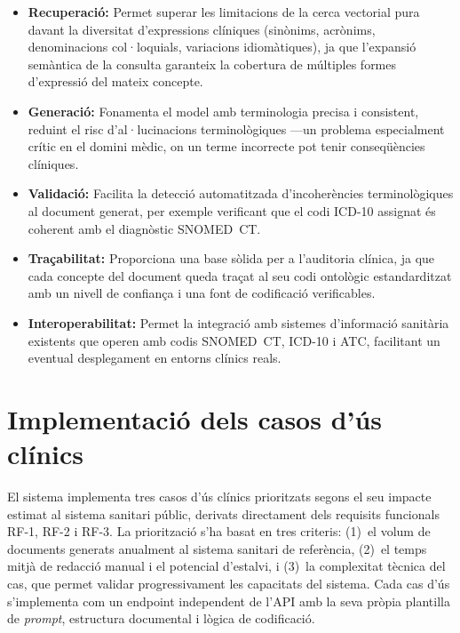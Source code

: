 \documentclass[CAT]{TFUOC}%
\begin{document}
\begin{itemize}
    \item \textbf{Recuperació:} Permet superar les limitacions de la cerca vectorial pura davant la diversitat d'expressions clíniques (sinònims, acrònims, denominacions col·loquials, variacions idiomàtiques), ja que l'expansió semàntica de la consulta garanteix la cobertura de múltiples formes d'expressió del mateix concepte.

    \item \textbf{Generació:} Fonamenta el model amb terminologia precisa i consistent, reduint el risc d'al·lucinacions terminològiques ---un problema especialment crític en el domini mèdic, on un terme incorrecte pot tenir conseqüències clíniques.

    \item \textbf{Validació:} Facilita la detecció automatitzada d'incoherències terminològiques al document generat, per exemple verificant que el codi ICD-10 assignat és coherent amb el diagnòstic SNOMED~CT.

    \item \textbf{Traçabilitat:} Proporciona una base sòlida per a l'auditoria clínica, ja que cada concepte del document queda traçat al seu codi ontològic estandarditzat amb un nivell de confiança i una font de codificació verificables.

    \item \textbf{Interoperabilitat:} Permet la integració amb sistemes d'informació sanitària existents que operen amb codis SNOMED~CT, ICD-10 i ATC, facilitant un eventual desplegament en entorns clínics reals.
\end{itemize}

\section{Implementació dels casos d'ús clínics}

El sistema implementa tres casos d'ús clínics prioritzats segons el seu impacte estimat al sistema sanitari públic, derivats directament dels requisits funcionals RF-1, RF-2 i RF-3. La priorització s'ha basat en tres criteris: (1)~el volum de documents generats anualment al sistema sanitari de referència, (2)~el temps mitjà de redacció manual i el potencial d'estalvi, i (3)~la complexitat tècnica del cas, que permet validar progressivament les capacitats del sistema. Cada cas d'ús s'implementa com un endpoint independent de l'API amb la seva pròpia plantilla de \textit{prompt}, estructura documental i lògica de codificació.
\end{document}

